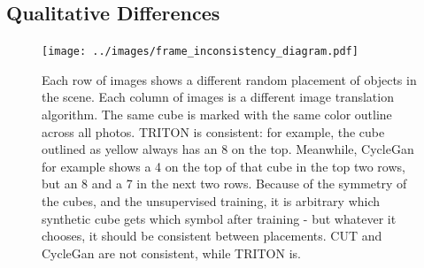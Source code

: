 \documentclass{article}
\begin{document}




\label{sec:results}


\subsection{Qualitative Differences}
\begin{figure}[H]
	\begin{center}
		\texttt{[image: ../images/frame\_inconsistency\_diagram.pdf]}
	\end{center}
	
	
	\caption{
		Each row of images shows a different random placement of objects in the scene.
		Each column of images is a different image translation algorithm.
		The same cube is marked with the same color outline across all photos.
		TRITON is consistent: for example, the cube outlined as yellow always has an 8 on the top.
		Meanwhile, CycleGan for example shows a 4 on the top of that cube in the top two rows, but an 8 and a 7 in the next two rows.
		Because of the symmetry of the cubes, and the unsupervised training, it is arbitrary which synthetic cube gets which symbol after training - but whatever it chooses, it should be consistent between placements.
		CUT and CycleGan are not consistent, while TRITON is.
		}
		\label{fig:frame_inconsistency_diagram}
	\end{figure}
	
\end{document}
